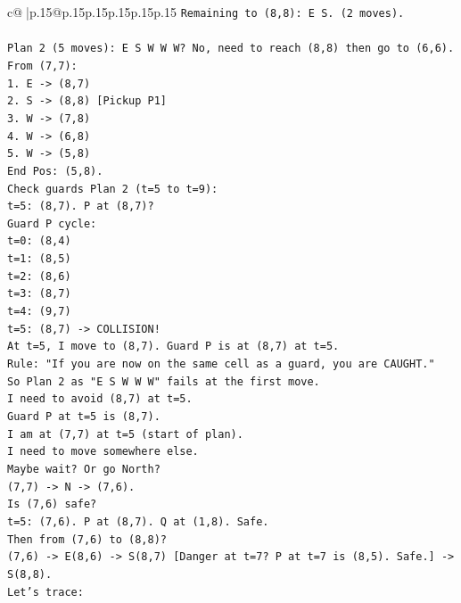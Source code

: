 \documentclass{article}
\begin{document}
{\begin{supertabular}{c@{$\;$}|p{.15\linewidth}@{}p{.15\linewidth}p{.15\linewidth}p{.15\linewidth}p{.15\linewidth}p{.15\linewidth}}
{{{\texttt{Remaining to (8,8): E S. (2 moves).} \\
\\ 
\texttt{Plan 2 (5 moves): E S W W W? No, need to reach (8,8) then go to (6,6).} \\
\texttt{From (7,7):} \\
\texttt{1. E {-}> (8,7)} \\
\texttt{2. S {-}> (8,8) {[}Pickup P1{]}} \\
\texttt{3. W {-}> (7,8)} \\
\texttt{4. W {-}> (6,8)} \\
\texttt{5. W {-}> (5,8)} \\
\texttt{End Pos: (5,8).} \\
\texttt{Check guards Plan 2 (t=5 to t=9):} \\
\texttt{t=5: (8,7). P at (8,7)?} \\
\texttt{Guard P cycle:} \\
\texttt{t=0: (8,4)} \\
\texttt{t=1: (8,5)} \\
\texttt{t=2: (8,6)} \\
\texttt{t=3: (8,7)} \\
\texttt{t=4: (9,7)} \\
\texttt{t=5: (8,7) {-}> COLLISION!} \\
\texttt{At t=5, I move to (8,7). Guard P is at (8,7) at t=5.} \\
\texttt{Rule: "If you are now on the same cell as a guard, you are CAUGHT."} \\
\texttt{So Plan 2 as "E S W W W" fails at the first move.} \\
\texttt{I need to avoid (8,7) at t=5.} \\
\texttt{Guard P at t=5 is (8,7).} \\
\texttt{I am at (7,7) at t=5 (start of plan).} \\
\texttt{I need to move somewhere else.} \\
\texttt{Maybe wait? Or go North?} \\
\texttt{(7,7) {-}> N {-}> (7,6).} \\
\texttt{Is (7,6) safe?} \\
\texttt{t=5: (7,6). P at (8,7). Q at (1,8). Safe.} \\
\texttt{Then from (7,6) to (8,8)?} \\
\texttt{(7,6) {-}> E(8,6) {-}> S(8,7) {[}Danger at t=7? P at t=7 is (8,5). Safe.{]} {-}> S(8,8).} \\
\texttt{Let's trace:} \\
}}}
\end{supertabular}}
\end{document}
